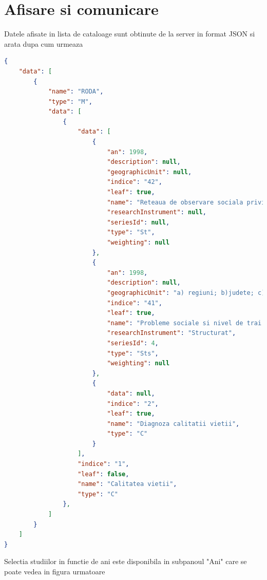 \section{Afisare si comunicare}


Datele afisate in lista de cataloage sunt obtinute de la server in format JSON si arata dupa cum urmeaza


\begin{lstlisting}[language=json]
{
    "data": [
        {
            "name": "RODA",
            "type": "M",
            "data": [
                {
                    "data": [
                        {
                            "an": 1998,
                            "description": null,
                            "geographicUnit": null,
                            "indice": "42",
                            "leaf": true,
                            "name": "Reteaua de observare sociala privind problemele populatiei de rromi - 1998",
                            "researchInstrument": null,
                            "seriesId": null,
                            "type": "St",
                            "weighting": null
                        },
                        {
                            "an": 1998,
                            "description": null,
                            "geographicUnit": "a) regiuni; b)judete; c) localitati",
                            "indice": "41",
                            "leaf": true,
                            "name": "Probleme sociale si nivel de trai - 1998",
                            "researchInstrument": "Structurat",
                            "seriesId": 4,
                            "type": "Sts",
                            "weighting": null
                        },
                        {
                            "data": null,
                            "indice": "2",
                            "leaf": true,
                            "name": "Diagnoza calitatii vietii",
                            "type": "C"
                        }
                    ],
                    "indice": "1",
                    "leaf": false,
                    "name": "Calitatea vietii",
                    "type": "C"
                },
            ]
        }
    ]
}
\end{lstlisting}

Selectia studiilor in functie de ani este disponibila in subpanoul "Ani" care se poate vedea in figura urmatoare

